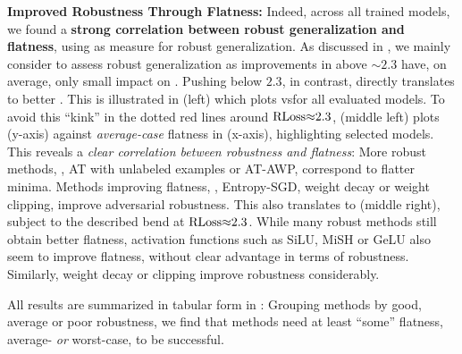 \textbf{Improved Robustness Through Flatness:}
% 
Indeed, across all trained models, we found a \textbf{strong correlation between robust generalization and flatness}, using \RCE as measure for robust generalization.
As discussed in , we mainly consider \RCE to assess robust generalization as improvements in \RCE above ${\sim}2.3$ have, on average, only small impact on \RTE. Pushing \RCE below $2.3$, in contrast, directly translates to better \RTE. This is illustrated in  (left) which plots \RTE vs\onedot \RCE for all evaluated models. To avoid this ``kink'' in the {\color{red}dotted red} lines around $\RCE{\approx}2.3$,  (middle left) plots \emph{\RCE} (y-axis) against \emph{average-case} flatness in \RCE (x-axis), highlighting selected models. This reveals a \emph{clear correlation between robustness and flatness}:
More robust methods, \eg, AT with unlabeled examples or AT-AWP, correspond to flatter minima. Methods improving flatness, \eg, Entropy-SGD, weight decay or weight clipping, improve adversarial robustness. This also translates to \RTE (middle right), subject to the described bend at $\RCE{\approx}2.3$. While many robust methods still obtain better flatness, activation functions such as SiLU, MiSH or GeLU also seem to improve flatness, without clear advantage in terms of robustness. Similarly, weight decay or clipping improve robustness considerably. 

 All results are summarized in tabular form in : Grouping methods by \colorbox{colorbrewer3!15}{good}, \colorbox{colorbrewer5!15}{average} or \colorbox{colorbrewer1!15}{poor} robustness, we find that methods need at least ``some'' flatness, average- \emph{or} worst-case, to be successful.

